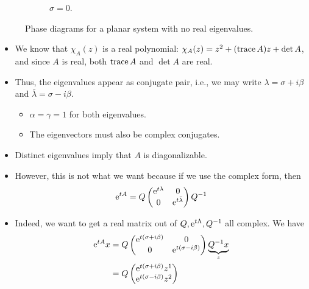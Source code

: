 \documentclass[../notes.tex]{subfiles}
\begin{document}
\begin{itemize}
\begin{figure}[h!]
\begin{subfigure}[b]{0.32\linewidth}
            \caption{$\sigma=0$.}
            \label{fig:planarComplexc}
        \end{subfigure}
        \caption{Phase diagrams for a planar system with no real eigenvalues.}
        \label{fig:planarComplex}
    \end{figure}
    \begin{itemize}
        \item We know that $\chi_A(z)$ is a real polynomial: $\chi_A(z)=z^2+(\trc A)z+\det A$, and since $A$ is real, both $\trc A$ and $\det A$ are real.
        \item Thus, the eigenvalues appear as conjugate pair, i.e., we may write $\lambda=\sigma+i\beta$ and $\bar{\lambda}=\sigma-i\beta$.
        \begin{itemize}
            \item $\alpha=\gamma=1$ for both eigenvalues.
            \item The eigenvectors must also be complex conjugates.
        \end{itemize}
        \item Distinct eigenvalues imply that $A$ is diagonalizable.
        \item However, this is not what we want because if we use the complex form, then
        \begin{equation*}
            \e[tA] = Q
            \begin{pmatrix}
                \e[t\lambda] & 0\\
                0 & \e[t\bar{\lambda}]\\
            \end{pmatrix}
            Q^{-1}
        \end{equation*}
        \item Indeed, we want to get a real matrix out of $Q,\e[t\Lambda],Q^{-1}$ all complex. We have
        \begin{align*}
            \e[tA]x &= Q
            \begin{pmatrix}
                \e[t(\sigma+i\beta)] & 0\\
                0 & \e[t(\sigma-i\beta)]\\
            \end{pmatrix}
            \underbrace{Q^{-1}x}_z\\
            &= Q
            \begin{pmatrix}
                \e[t(\sigma+i\beta)]z^1\\
                \e[t(\sigma-i\beta)]z^2\\

\end{pmatrix}
\end{align*}
\end{itemize}
\end{itemize}
\end{document}
